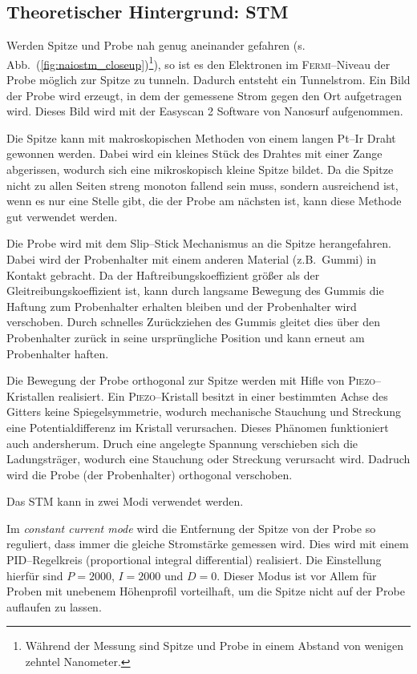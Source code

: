 \documentclass[sn-mathphys-num,iicol]{sn-jnl}
\theoremstyle{thmstyleone}
\theoremstyle{thmstyletwo}
\theoremstyle{thmstylethree}
\begin{document}
\subsection{Theoretischer Hintergrund: STM}
Werden Spitze und Probe nah genug aneinander gefahren (s. Abb.\ (\ref{fig:naiostm_closeup})\footnote{Während der Messung sind Spitze und Probe in einem Abstand von wenigen zehntel Nanometer.}), so ist es den Elektronen im \textsc{Fermi}--Niveau der Probe möglich zur Spitze zu tunneln.
Dadurch entsteht ein Tunnelstrom.
Ein Bild der Probe wird erzeugt, in dem der gemessene Strom gegen den Ort aufgetragen wird.
Dieses Bild wird mit der \glqq Easyscan 2\grqq{} Software von Nanosurf aufgenommen.

Die Spitze kann mit makroskopischen Methoden von einem langen Pt--Ir Draht gewonnen werden.
Dabei wird ein kleines Stück des Drahtes mit einer Zange abgerissen, wodurch sich eine mikroskopisch kleine Spitze bildet.
Da die Spitze nicht zu allen Seiten streng monoton fallend sein muss, sondern ausreichend ist, wenn es nur eine Stelle gibt, die der Probe am nächsten ist, kann diese Methode gut verwendet werden.

Die Probe wird mit dem Slip--Stick Mechanismus an die Spitze herangefahren.
Dabei wird der Probenhalter mit einem anderen Material (z.B.\ Gummi) in Kontakt gebracht.
Da der Haftreibungskoeffizient größer als der Gleitreibungskoeffizient ist, kann durch langsame Bewegung des Gummis die Haftung zum Probenhalter erhalten bleiben und der Probenhalter wird verschoben.
Durch schnelles Zurückziehen des Gummis gleitet dies über den Probenhalter zurück in seine ursprüngliche Position und kann erneut am Probenhalter haften.

Die Bewegung der Probe orthogonal zur Spitze werden mit Hifle von \textsc{Piezo}--Kristallen realisiert.
Ein \textsc{Piezo}--Kristall besitzt in einer bestimmten Achse des Gitters keine Spiegelsymmetrie, wodurch mechanische Stauchung und Streckung eine Potentialdifferenz im Kristall verursachen.
Dieses Phänomen funktioniert auch andersherum.
Druch eine angelegte Spannung verschieben sich die Ladungsträger, wodurch eine Stauchung oder Streckung verursacht wird.
Dadruch wird die Probe (der Probenhalter) orthogonal verschoben.

Das STM kann in zwei Modi verwendet werden.

Im \textit{constant current mode} wird die Entfernung der Spitze von der Probe so reguliert, dass immer die gleiche Stromstärke gemessen wird.
Dies wird mit einem PID--Regelkreis (proportional integral differential) realisiert.
Die Einstellung hierfür sind $P=2000$, $I=2000$ und $D=0$.
Dieser Modus ist vor Allem für Proben mit unebenem Höhenprofil vorteilhaft, um die Spitze nicht auf der Probe auflaufen zu lassen.
\end{document}
